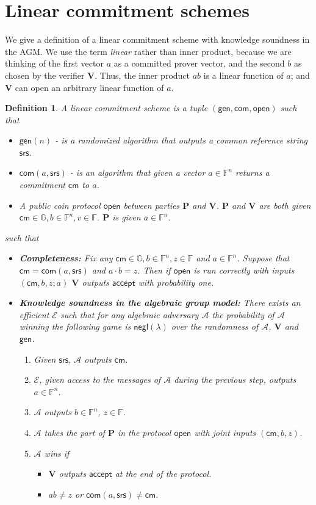 \documentclass[11pt]{article} %
\newcommand{\G}{\ensuremath{{\mathbb G}}\xspace}
\newcommand{\F}{\ensuremath{\mathbb F}\xspace}
\newcommand{\adv}{\ensuremath{\mathcal A}\xspace}
\newcommand{\srs}{\ensuremath{\mathsf{srs}}\xspace}
\newcommand{\com}{\ensuremath{\mathsf{com}}\xspace}
\newcommand{\cm}{\ensuremath{\mathsf{cm}}\xspace}
\newcommand{\open}{\ensuremath{\mathsf{open}}\xspace}
\newcommand{\negl}{\ensuremath{\mathsf{negl}(\lambda)}\xspace}
\newcommand{\acc}{\ensuremath{\mathsf{accept}}\xspace}
\newcommand{\gen}{\ensuremath{\mathsf{gen}}\xspace}
\newcommand{\prv}{\ensuremath{\mathsf{\mathbf{P}}}\xspace}
\newcommand{\verpc}{\ver}
\newcommand{\ver}{\ensuremath{\mathsf{\mathbf{V}}}\xspace}
\newcommand{\ext}{\ensuremath{\mathcal{E}}\xspace}
\newcommand{\fn}{\ensuremath{\F^n}\xspace}
\newtheorem{dfn}[lemma]{Definition}
\begin{document}
\newcommand{\vecs}{\ensuremath{\F^n}\xspace}
\section{Linear commitment schemes}\label{sec:LCS}
We give a definition of a linear commitment scheme with knowledge soundness in the AGM.
We use the term \emph{linear} rather than inner product, because we are thinking of the first vector $a$ as a committed prover vector,
and the second $b$ as chosen by the verifier \ver. Thus, the inner product $ab$ is a linear function of $a$; and \ver can open an arbitrary linear function of $a$. 
\begin{dfn}\label{dfn:linearscheme}
A \emph{linear commitment scheme} is a tuple $(\gen,\com,\open)$ such that 
\begin{itemize}
 \item $\gen(n)$ -  is a randomized algorithm that outputs a common reference string \srs.
 \item $\com(a,\srs)$ - is an algorithm that given a vector $a\in \vecs$ returns a commitment \cm to $a$.
 \item A public coin protocol  \open between parties \prv and \ver. \prv and \ver are both given $\cm\in \G,b\in \vecs,v\in \F$. \prv is given $a\in \vecs$. 
 \end{itemize}
such that
\begin{itemize}
 \item \textbf{Completeness:} Fix any $\cm\in \G, b\in \fn, z\in \F$ and $a\in\fn$.
 Suppose that  $\cm = \com(a,\srs)$ and $a\cdot b=z$.  Then if \open is run correctly with inputs $(\cm,b,z;a)$
\ver outputs \acc with probability one.
 \item \textbf{Knowledge soundness in the algebraic group model:} There exists an efficient \ext such that for any algebraic adversary \adv the probability of \adv winning the following game is \negl over the randomness of \adv, \ver and \gen.
 \begin{enumerate}
  \item Given \srs, \adv outputs $\cm$.
  \item\label{step:ksrndone} \ext, given access to the messages of \adv during the previous step, outputs $a\in \fn$.
  \item\label{step:ksrndtwo} \adv outputs $ b\in \fn$, $z \in \F$.
  \item \adv takes the part of \prv in the protocol \open with joint inputs $(\cm,b,z)$.
  \item $\adv$ wins if 
  \begin{itemize} 
   \item \verpc outputs \acc at the end of the protocol.
   \item $ab\neq z$ or $\com(a,\srs) \neq \cm$.
  \end{itemize}

 \end{enumerate}

\end{itemize}
\end{dfn}
\end{document}
